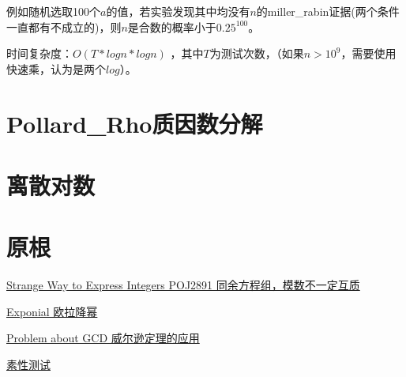 例如随机选取100个$a$的值，若实验发现其中均没有$n$的miller\_rabin证据(两个条件一直都有不成立的)，则$n$是合数的概率小于$0.25^{100}$。


时间复杂度：$O(T*logn*logn)$ ，其中$T$为测试次数，（如果$n>10^9$，需要使用快速乘，认为是两个$log$）。


\section{Pollard\_Rho质因数分解}


\section{离散对数}


\section{原根}




\begin{problemset}
	\item \href{http://poj.org/problem?id=2891}{Strange Way to Express Integers \quad POJ2891 \quad 同余方程组，模数不一定互质}  
	\item \href{https://cn.vjudge.net/problem/Gym-101550E#}{Exponial \quad 欧拉降幂}
	\item \href{http://acm.hdu.edu.cn/showproblem.php?pid=4910}{Problem about GCD \quad 威尔逊定理的应用}
	\item \href{}{ \quad 素性测试}
\end{problemset}


